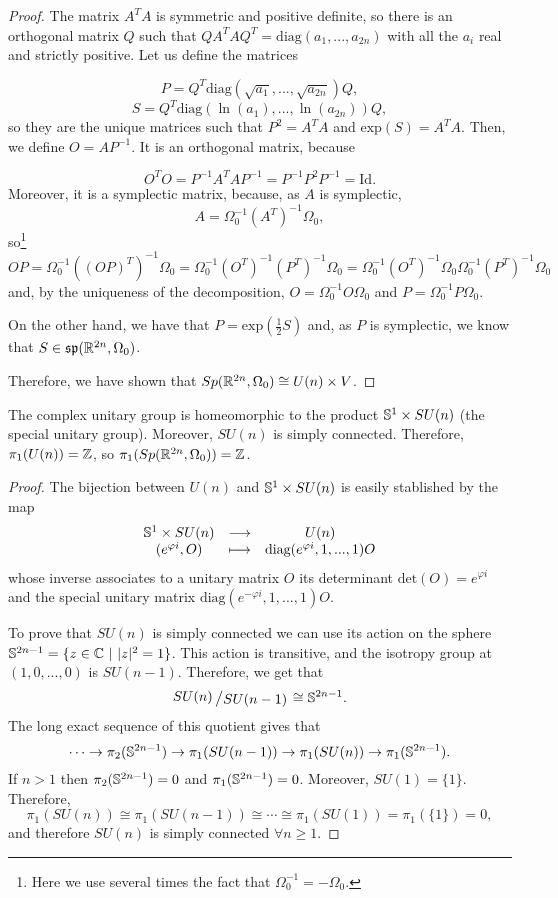 \begin{proof}
The matrix $A^TA$ is symmetric and positive definite, so there is an orthogonal matrix $Q$ such that $QA^TAQ^T = \text{diag}(a_1,...,a_{2n})$ with all the $a_i$ real and strictly positive. Let us define the matrices

\[P = Q^T\text{diag}(\sqrt{a_1},...,\sqrt{a_{2n}}) Q, \]
\[S = Q^T\text{diag}(\ln(a_1),...,\ln(a_{2n})) Q ,\]
so they are the unique matrices such that $P^2 = A^TA$ and $\text{exp}(S) = A^TA$. Then, we define $O = AP^{-1}$. It is an orthogonal matrix, because

\[O^TO = P^{-1}A^TAP^{-1} = P^{-1} P^2 P^{-1} = \text{Id} .\]
Moreover, it is a symplectic matrix, because, as $A$ is symplectic,
\[A = \Omega_0^{-1} (A^T)^{-1} \Omega_0,\]
so\footnote{Here we use several times the fact that $\Omega_0^{-1} = -\Omega_0$.}
\[OP = \Omega_0^{-1}((OP)^T)^{-1} \Omega_0 = \Omega_0^{-1} (O^T)^{-1} (P^T)^{-1} \Omega_0 = \Omega_0^{-1} (O^T)^{-1} \Omega_0 \Omega_0^{-1} (P^T)^{-1} \Omega_0\]
and, by the uniqueness of the decomposition, $O = \Omega_0^{-1} O \Omega_0$ and $P = \Omega_0^{-1} P \Omega_0$.

On the other hand, we have that $P = \text{exp}(\frac12 S)$ and, as $P$ is symplectic, we know that $S \in \mathfrak{sp}(\mathbb{R}^{2n},\Omega_0)$.

Therefore, we have shown that $Sp(\mathbb{R}^{2n}, \Omega_0) \cong U(n) \times V$.
\end{proof}

\begin{prop}
The complex unitary group is homeomorphic to the product $\mathbb{S}^1 \times SU(n)$ (the special unitary group). Moreover, $SU(n)$ is simply connected. Therefore, $\pi_1(U(n)) = \mathbb{Z}$, so $\pi_1(Sp(\mathbb{R}^{2n},\Omega_0)) = \mathbb{Z}$.
\end{prop}

\begin{proof}
The bijection between $U(n)$ and $\mathbb{S}^1 \times SU(n)$ is easily stablished by the map
\[\begin{array}{ccc} \mathbb{S}^1 \times SU(n) & \longrightarrow & U(n) \\ (e^{\varphi i}, O) & \longmapsto & \text{diag}(e^{\varphi i},1,...,1) O \end{array}\]
whose inverse associates to a unitary matrix $O$ its determinant $\text{det}(O) = e^{\varphi i}$ and the special unitary matrix $\text{diag}(e^{-\varphi i},1,...,1) O$.

To prove that $SU(n)$ is simply connected we can use its action on the sphere $\mathbb{S}^{2n-1} = \{z \in \mathbb{C} \ | \ |z|^2 = 1\}$. This action is transitive, and the isotropy group at $(1,0,...,0)$ is $SU(n-1)$. Therefore, we get that
\[\quocient{SU(n)}{SU(n-1)} \cong \con{S}^{2n-1} .\]
The long exact sequence of this quotient gives that
\[\cdots \rightarrow \pi_2(\mathbb{S}^{2n-1}) \rightarrow \pi_1(SU(n-1)) \rightarrow \pi_1(SU(n)) \rightarrow \pi_1(\mathbb{S}^{2n-1}) .\]
If $n > 1$ then $\pi_2(\mathbb{S}^{2n-1}) = 0$ and $\pi_1(\mathbb{S}^{2n-1})=0$. Moreover, $SU(1)=\{1\}$. Therefore,
\[\pi_1(SU(n)) \cong \pi_1(SU(n-1)) \cong \cdots \cong \pi_1(SU(1)) = \pi_1(\{1\}) = 0,\]
and therefore $SU(n)$ is simply connected $\forall n \geq 1$.
\end{proof}

